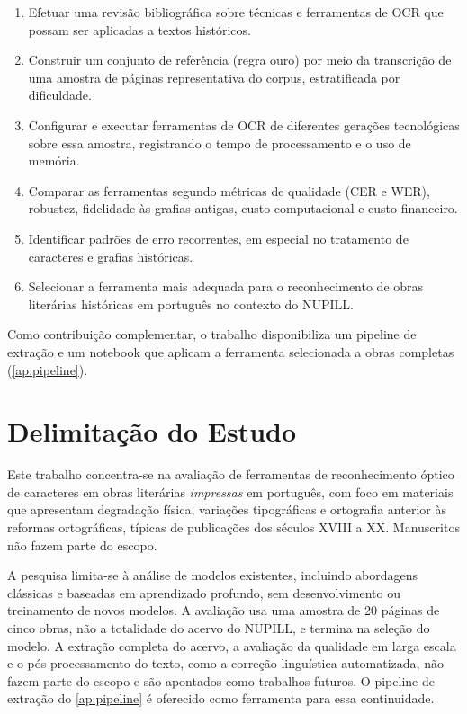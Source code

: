 \documentclass[noabntexcite,oneside]{ufsc-thesis-rn46-2019}
\begin{document}
\begin{enumerate}
    \item Efetuar uma revisão bibliográfica sobre técnicas e ferramentas de OCR que
    possam ser aplicadas a textos históricos.

    \item Construir um conjunto de referência (regra ouro) por meio da transcrição de uma
    amostra de páginas representativa do corpus, estratificada por dificuldade.

    \item Configurar e executar ferramentas de OCR de diferentes gerações tecnológicas sobre
    essa amostra, registrando o tempo de processamento e o uso de memória.

    \item Comparar as ferramentas segundo métricas de qualidade (CER e WER), robustez,
    fidelidade às grafias antigas, custo computacional e custo financeiro.

    \item Identificar padrões de erro recorrentes, em especial no tratamento de caracteres
    e grafias históricas.

    \item Selecionar a ferramenta mais adequada para o reconhecimento de obras literárias
    históricas em português no contexto do NUPILL.
\end{enumerate}

Como contribuição complementar, o trabalho disponibiliza um pipeline de extração e um
notebook que aplicam a ferramenta selecionada a obras completas
(\autoref{ap:pipeline}).

\section{Delimitação do Estudo}

Este trabalho concentra-se na avaliação de ferramentas de reconhecimento óptico de
caracteres em obras literárias \textit{impressas} em português, com foco em materiais que
apresentam degradação física, variações tipográficas e ortografia anterior às reformas
ortográficas, típicas de publicações dos séculos XVIII a XX. Manuscritos não fazem parte do
escopo.

A pesquisa limita-se à análise de modelos existentes, incluindo abordagens clássicas e
baseadas em aprendizado profundo, sem desenvolvimento ou treinamento de novos modelos. A
avaliação usa uma amostra de 20 páginas de cinco obras, não a totalidade do acervo do
NUPILL, e termina na seleção do modelo. A extração completa do acervo, a avaliação da
qualidade em larga escala e o pós-processamento do texto, como a correção linguística
automatizada, não fazem parte do escopo e são apontados como trabalhos futuros. O pipeline
de extração do \autoref{ap:pipeline} é oferecido como ferramenta para essa
continuidade.
\end{document}

